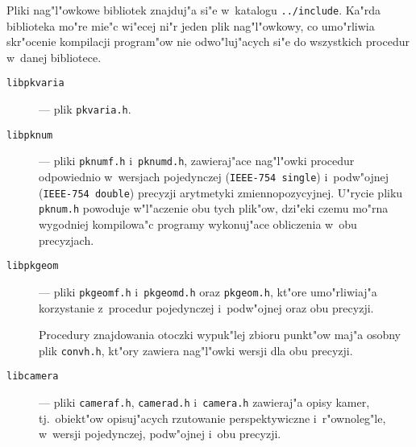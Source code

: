 Pliki nag"l"owkowe bibliotek znajduj"a si"e w~katalogu \texttt{../include}.
Ka"rda biblioteka mo"re mie"c wi"ecej ni"r jeden plik nag"l"owkowy, co
umo"rliwia skr"ocenie kompilacji program"ow nie odwo"luj"acych si"e do
wszystkich procedur w~danej bibliotece.
\begin{description}
\item[\texttt{libpkvaria}]--- plik \texttt{pkvaria.h}.
\item[\texttt{libpknum}]--- pliki \texttt{pknumf.h} i~\texttt{pknumd.h},
zawieraj"ace nag"l"owki procedur odpowiednio w~wersjach pojedynczej
(\texttt{IEEE-754 single}) i~podw"ojnej (\texttt{IEEE-754 double}) precyzji
arytmetyki zmiennopozycyjnej. U"rycie pliku \texttt{pknum.h} powoduje
w"l"aczenie obu tych plik"ow, dzi"eki czemu mo"rna wygodniej kompilowa"c
programy wykonuj"ace obliczenia w~obu precyzjach.
\item[\texttt{libpkgeom}]--- pliki \texttt{pkgeomf.h} i~\texttt{pkgeomd.h} oraz
\texttt{pkgeom.h}, kt"ore umo"rliwiaj"a korzystanie z~procedur pojedynczej
i~podw"ojnej oraz obu precyzji.

Procedury znajdowania otoczki wypuk"lej zbioru punkt"ow maj"a osobny plik
\texttt{convh.h}, kt"ory zawiera nag"l"owki wersji dla obu precyzji.
\item[\texttt{libcamera}]--- pliki \texttt{cameraf.h}, \texttt{camerad.h}
i~\texttt{camera.h} zawieraj"a opisy kamer,
tj.\ obiekt"ow opisuj"acych rzutowanie perspektywiczne i~r"ownoleg"le,
w~wersji pojedynczej, podw"ojnej i~obu precyzji.


\end{description}
